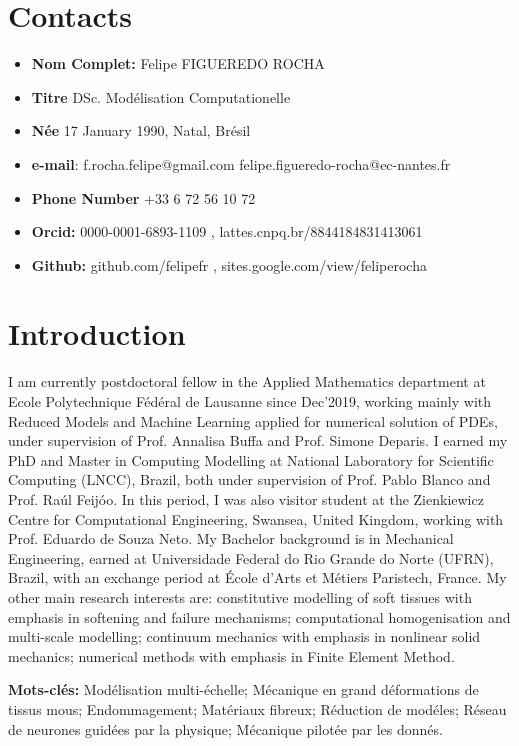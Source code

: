 \documentclass[french]{article}
\begin{document}
\section{Contacts}

\begin{itemize}
	\item \textbf{Nom Complet:} Felipe FIGUEREDO ROCHA %
	\item \textbf{Titre} DSc. Modélisation Computationelle %
	\item \textbf{Née} 17 January 1990, Natal, Brésil %
	\item \textbf{e-mail}: f.rocha.felipe@gmail.com \newline felipe.figueredo-rocha@ec-nantes.fr %
	\item \textbf{Phone Number} +33 6 72 56 10 72 %
	\item \textbf{Orcid:} 0000-0001-6893-1109 , lattes.cnpq.br/8844184831413061
	\item \textbf{Github:} github.com/felipefr , sites.google.com/view/feliperocha
\end{itemize}


\section{Introduction}
I am currently postdoctoral fellow in the Applied Mathematics department at Ecole Polytechnique Fédéral de Lausanne since Dec'2019, working mainly with Reduced Models and Machine Learning applied for numerical solution of PDEs, under supervision of Prof. Annalisa Buffa and Prof. Simone Deparis. I earned my PhD and Master in Computing Modelling at National Laboratory for Scientific Computing (LNCC), Brazil, both under supervision of Prof. Pablo Blanco and Prof. Raúl Feijóo. In this period, I was also visitor student at the Zienkiewicz Centre for Computational Engineering, Swansea, United Kingdom, working with Prof. Eduardo de Souza Neto. My Bachelor background is in Mechanical Engineering, earned at Universidade Federal do Rio Grande do Norte (UFRN), Brazil, with an exchange period at École d'Arts et Métiers Paristech, France. My other main research interests are: constitutive modelling of soft tissues with emphasis in softening and failure mechanisms; computational homogenisation and multi-scale modelling; continuum mechanics with emphasis in nonlinear solid mechanics; numerical methods with emphasis in Finite Element Method.

\leftline
\textbf{Mots-clés: } Modélisation multi-échelle; Mécanique en grand déformations de tissus mous; Endommagement; Matériaux fibreux; Réduction de modéles; Réseau de neurones guidées par la physique; Mécanique pilotée par les donnés.
\end{document}
